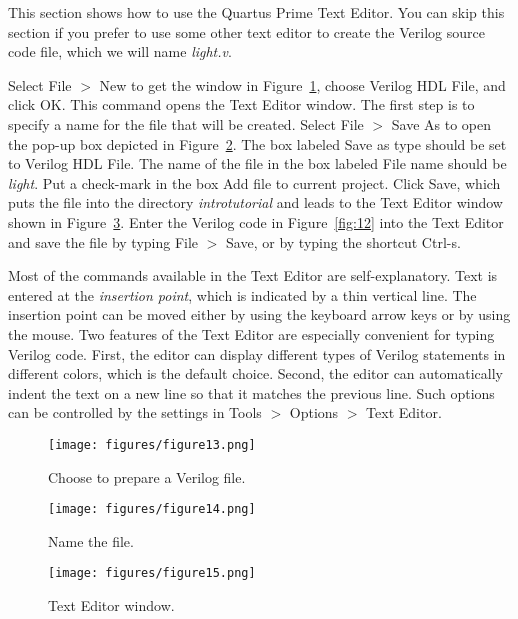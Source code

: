 \noindent 
This section shows how to use the Quartus Prime Text Editor.
You can skip this section if you prefer to use some other text editor
to create the Verilog source code file, which we will name {\it light.v}. 

Select {\sf File $>$ New} to get the window in Figure~\ref{fig:13}, 
choose {\sf Verilog HDL File}, and click {\sf OK}. 
This command opens the Text Editor window.  The first step is to specify a name
for the file that will be created. Select {\sf File $>$ Save As}
to open the pop-up box depicted in Figure~\ref{fig:14}. 
The box labeled {\sf Save as type} should be set to {\sf Verilog HDL File}.
The name of the file in the box labeled {\sf File name} should be {\it light}.
Put a check-mark in the box {\sf Add file to current project}.
Click {\sf Save}, which puts the file into the directory
{\it introtutorial} and leads to the Text Editor window shown
in Figure~\ref{fig:15}. 
Enter the Verilog code in Figure~\ref{fig:12}
into the Text Editor and save the file by typing {\sf File $>$ Save}, or by typing 
the shortcut {\sf Ctrl-s}.

Most of the commands available in the Text Editor are self-explanatory. 
Text is entered at the {\it insertion point}, which is indicated by a thin
vertical line. The insertion point can be moved either by using the
keyboard arrow keys or by using the mouse. Two features of 
the Text Editor are especially convenient for typing Verilog
code. First, the editor can display different types of Verilog
statements in different colors, which is the default choice. 
Second, the editor can automatically
indent the text on a new line so that it matches the previous line. 
Such options can be controlled by the settings 
in {\sf Tools $>$ Options $>$ Text Editor}.

\begin{figure}[H]
   \begin{center}
      \texttt{[image: figures/figure13.png]}
   \caption{Choose to prepare a Verilog file.} 
	 \label{fig:13}
	 \end{center}
\end{figure}

\begin{figure}[H]
   \begin{center}
      \texttt{[image: figures/figure14.png]}
   \caption{Name the file.} 
	 \label{fig:14}
	 \end{center}
\end{figure}

\begin{figure}[H]
   \begin{center}
      \texttt{[image: figures/figure15.png]}
   \caption{Text Editor window.} 
	 \label{fig:15}
	 \end{center}
\end{figure}

